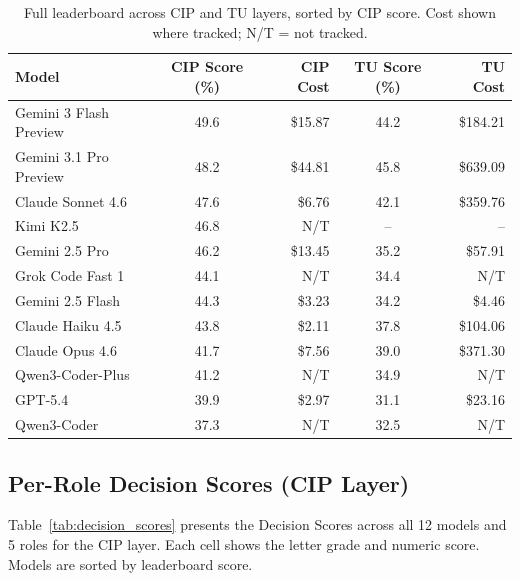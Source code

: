 \documentclass[10pt,twocolumn]{article}
\begin{document}
\begin{table}[t]
\centering
\caption{Full leaderboard across CIP and TU layers, sorted by CIP score. Cost shown where tracked; N/T = not tracked.}
\label{tab:leaderboard}
\small
\begin{tabular}{@{}l c r c r@{}}
\toprule
\textbf{Model} & \textbf{CIP Score (\%)} & \textbf{CIP Cost} & \textbf{TU Score (\%)} & \textbf{TU Cost} \\
\midrule
Gemini 3 Flash Preview     & 49.6 & \$15.87   & 44.2 & \$184.21 \\
Gemini 3.1 Pro Preview     & 48.2 & \$44.81   & 45.8 & \$639.09 \\
Claude Sonnet 4.6          & 47.6 & \$6.76    & 42.1 & \$359.76 \\
Kimi K2.5                  & 46.8 & N/T       & --   & -- \\
Gemini 2.5 Pro             & 46.2 & \$13.45   & 35.2 & \$57.91 \\
Grok Code Fast 1           & 44.1 & N/T       & 34.4 & N/T \\
Gemini 2.5 Flash           & 44.3 & \$3.23    & 34.2 & \$4.46 \\
Claude Haiku 4.5           & 43.8 & \$2.11    & 37.8 & \$104.06 \\
Claude Opus 4.6            & 41.7 & \$7.56    & 39.0 & \$371.30 \\
Qwen3-Coder-Plus           & 41.2 & N/T       & 34.9 & N/T \\
GPT-5.4                    & 39.9 & \$2.97    & 31.1 & \$23.16 \\
Qwen3-Coder                & 37.3 & N/T       & 32.5 & N/T \\
\bottomrule
\end{tabular}
\end{table}

\subsection{Per-Role Decision Scores (CIP Layer)}
\label{sec:per_role}

Table~\ref{tab:decision_scores} presents the Decision Scores across all 12 models and 5 roles for the CIP layer. Each cell shows the letter grade and numeric score. Models are sorted by leaderboard score.
\end{document}
